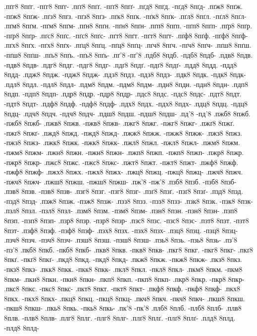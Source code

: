{.пґг8 8пґг. -пґг8 8пґг-
.пґґ8 8пґґ. -пґґ8 8пґґ-
.пґд8 8пґд. -пґд8 8пґд-
.пґж8 8пґж. -пґж8 8пґж-
.пґз8 8пґз. -пґз8 8пґз-
.пґк8 8пґк. -пґк8 8пґк-
.пґл8 8пґл. -пґл8 8пґл-
.пґм8 8пґм. -пґм8 8пґм-
.пґн8 8пґн. -пґн8 8пґн-
.пґп8 8пґп. -пґп8 8пґп-
.пґр8 8пґр. -пґр8 8пґр-
.пґс8 8пґс. -пґс8 8пґс-
.пґт8 8пґт. -пґт8 8пґт-
.пґф8 8пґф. -пґф8 8пґф-
.пґх8 8пґх. -пґх8 8пґх-
.пґц8 8пґц. -пґц8 8пґц-
.пґч8 8пґч. -пґч8 8пґч-
.пґш8 8пґш. -пґш8 8пґш-
.пґь8 8пґь. -пґь8 8пґь-
.пґ'8 -пґ'8
.пдб8 8пдб. -пдб8 8пдб-
.пдв8 8пдв. -пдв8 8пдв-
.пдг8 8пдг. -пдг8 8пдг-
.пдґ8 8пдґ. -пдґ8 8пдґ-
.пдд8 8пдд. -пдд8 8пдд-
.пдж8 8пдж. -пдж8 8пдж-
.пдз8 8пдз. -пдз8 8пдз-
.пдк8 8пдк. -пдк8 8пдк-
.пдл8 8пдл. -пдл8 8пдл-
.пдм8 8пдм. -пдм8 8пдм-
.пдн8 8пдн. -пдн8 8пдн-
.пдп8 8пдп. -пдп8 8пдп-
.пдр8 8пдр. -пдр8 8пдр-
.пдс8 8пдс. -пдс8 8пдс-
.пдт8 8пдт. -пдт8 8пдт-
.пдф8 8пдф. -пдф8 8пдф-
.пдх8 8пдх. -пдх8 8пдх-
.пдц8 8пдц. -пдц8 8пдц-
.пдч8 8пдч. -пдч8 8пдч-
.пдш8 8пдш. -пдш8 8пдш-
.пд'8 -пд'8
.пжб8 8пжб. -пжб8 8пжб-
.пжв8 8пжв. -пжв8 8пжв-
.пжг8 8пжг. -пжг8 8пжг-
.пжґ8 8пжґ. -пжґ8 8пжґ-
.пжд8 8пжд. -пжд8 8пжд-
.пжж8 8пжж. -пжж8 8пжж-
.пжз8 8пжз. -пжз8 8пжз-
.пжк8 8пжк. -пжк8 8пжк-
.пжл8 8пжл. -пжл8 8пжл-
.пжм8 8пжм. -пжм8 8пжм-
.пжн8 8пжн. -пжн8 8пжн-
.пжп8 8пжп. -пжп8 8пжп-
.пжр8 8пжр. -пжр8 8пжр-
.пжс8 8пжс. -пжс8 8пжс-
.пжт8 8пжт. -пжт8 8пжт-
.пжф8 8пжф. -пжф8 8пжф-
.пжх8 8пжх. -пжх8 8пжх-
.пжц8 8пжц. -пжц8 8пжц-
.пжч8 8пжч. -пжч8 8пжч-
.пжш8 8пжш. -пжш8 8пжш-
.пж'8 -пж'8
.пзб8 8пзб. -пзб8 8пзб-
.пзв8 8пзв. -пзв8 8пзв-
.пзг8 8пзг. -пзг8 8пзг-
.пзґ8 8пзґ. -пзґ8 8пзґ-
.пзд8 8пзд. -пзд8 8пзд-
.пзж8 8пзж. -пзж8 8пзж-
.пзз8 8пзз. -пзз8 8пзз-
.пзк8 8пзк. -пзк8 8пзк-
.пзл8 8пзл. -пзл8 8пзл-
.пзм8 8пзм. -пзм8 8пзм-
.пзн8 8пзн. -пзн8 8пзн-
.пзп8 8пзп. -пзп8 8пзп-
.пзр8 8пзр. -пзр8 8пзр-
.пзс8 8пзс. -пзс8 8пзс-
.пзт8 8пзт. -пзт8 8пзт-
.пзф8 8пзф. -пзф8 8пзф-
.пзх8 8пзх. -пзх8 8пзх-
.пзц8 8пзц. -пзц8 8пзц-
.пзч8 8пзч. -пзч8 8пзч-
.пзш8 8пзш. -пзш8 8пзш-
.пзь8 8пзь. -пзь8 8пзь-
.пз'8 -пз'8
.пкб8 8пкб. -пкб8 8пкб-
.пкв8 8пкв. -пкв8 8пкв-
.пкг8 8пкг. -пкг8 8пкг-
.пкґ8 8пкґ. -пкґ8 8пкґ-
.пкд8 8пкд. -пкд8 8пкд-
.пкж8 8пкж. -пкж8 8пкж-
.пкз8 8пкз. -пкз8 8пкз-
.пкк8 8пкк. -пкк8 8пкк-
.пкл8 8пкл. -пкл8 8пкл-
.пкм8 8пкм. -пкм8 8пкм-
.пкн8 8пкн. -пкн8 8пкн-
.пкп8 8пкп. -пкп8 8пкп-
.пкр8 8пкр. -пкр8 8пкр-
.пкс8 8пкс. -пкс8 8пкс-
.пкт8 8пкт. -пкт8 8пкт-
.пкф8 8пкф. -пкф8 8пкф-
.пкх8 8пкх. -пкх8 8пкх-
.пкц8 8пкц. -пкц8 8пкц-
.пкч8 8пкч. -пкч8 8пкч-
.пкш8 8пкш. -пкш8 8пкш-
.пкь8 8пкь. -пкь8 8пкь-
.пк'8 -пк'8
.плб8 8плб. -плб8 8плб-
.плв8 8плв. -плв8 8плв-
.плг8 8плг. -плг8 8плг-
.плґ8 8плґ. -плґ8 8плґ-
.плд8 8плд. -плд8 8плд-
}
